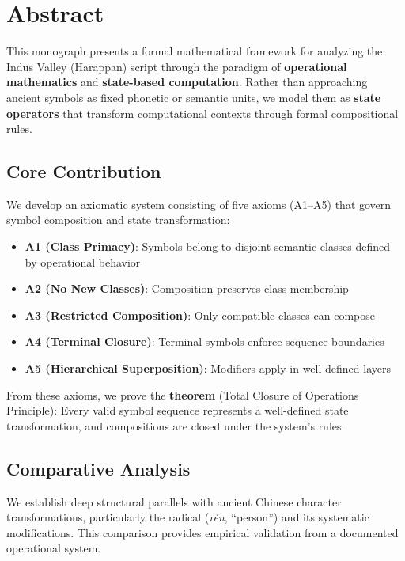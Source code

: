 \chapter*{Abstract}

This monograph presents a formal mathematical framework for analyzing the Indus Valley (Harappan) script through the paradigm of \textbf{operational mathematics} and \textbf{state-based computation}. Rather than approaching ancient symbols as fixed phonetic or semantic units, we model them as \textbf{state operators} that transform computational contexts through formal compositional rules.

\section*{Core Contribution}

We develop an axiomatic system consisting of five axioms (A1--A5) that govern symbol composition and state transformation:

\begin{itemize}
    \item \textbf{A1 (Class Primacy)}: Symbols belong to disjoint semantic classes defined by operational behavior
    \item \textbf{A2 (No New Classes)}: Composition preserves class membership
    \item \textbf{A3 (Restricted Composition)}: Only compatible classes can compose
    \item \textbf{A4 (Terminal Closure)}: Terminal symbols enforce sequence boundaries
    \item \textbf{A5 (Hierarchical Superposition)}: Modifiers apply in well-defined layers
\end{itemize}

From these axioms, we prove the \textbf{\TCOP{} theorem} (Total Closure of Operations Principle): Every valid symbol sequence represents a well-defined state transformation, and compositions are closed under the system's rules.

\section*{Comparative Analysis}

We establish deep structural parallels with ancient Chinese character transformations, particularly the radical \ren{} (\textit{rén}, ``person'') and its systematic modifications. This comparison provides empirical validation from a documented operational system.


